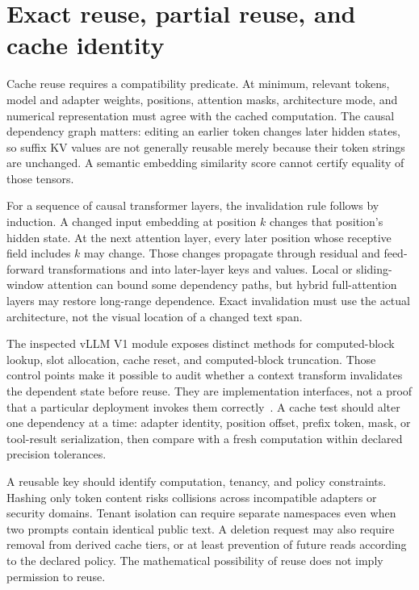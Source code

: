 \section{Exact reuse, partial reuse, and cache identity}\label{sec:C31:04}
Cache reuse requires a compatibility predicate. At minimum, relevant tokens, model and adapter weights, positions, attention masks, architecture mode, and numerical representation must agree with the cached computation. The causal dependency graph matters: editing an earlier token changes later hidden states, so suffix KV values are not generally reusable merely because their token strings are unchanged. A semantic embedding similarity score cannot certify equality of those tensors.

For a sequence of causal transformer layers, the invalidation rule follows by induction. A changed input embedding at position $k$ changes that position's hidden state. At the next attention layer, every later position whose receptive field includes $k$ may change. Those changes propagate through residual and feed-forward transformations and into later-layer keys and values. Local or sliding-window attention can bound some dependency paths, but hybrid full-attention layers may restore long-range dependence. Exact invalidation must use the actual architecture, not the visual location of a changed text span.

The inspected vLLM V1 module  exposes distinct methods for computed-block lookup, slot allocation, cache reset, and computed-block truncation. Those control points make it possible to audit whether a context transform invalidates the dependent state before reuse. They are implementation interfaces, not a proof that a particular deployment invokes them correctly~\cite{repo_vllm}. A cache test should alter one dependency at a time: adapter identity, position offset, prefix token, mask, or tool-result serialization, then compare with a fresh computation within declared precision tolerances.

A reusable key should identify computation, tenancy, and policy constraints. Hashing only token content risks collisions across incompatible adapters or security domains. Tenant isolation can require separate namespaces even when two prompts contain identical public text. A deletion request may also require removal from derived cache tiers, or at least prevention of future reads according to the declared policy. The mathematical possibility of reuse does not imply permission to reuse.

